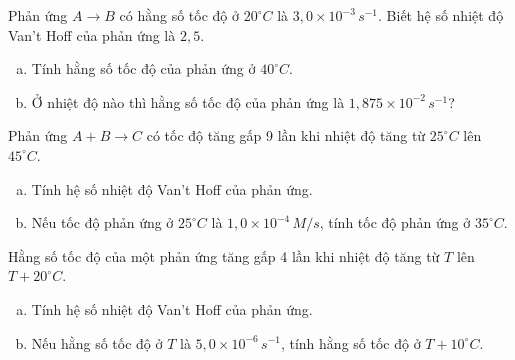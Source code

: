 \documentclass[Main.tex]{subfiles}
\begin{document}
\begin{bt}
	Phản ứng $A \rightarrow B$ có hằng số tốc độ ở $20^\circ C$ là $3{,}0 \times 10^{-3} \, s^{-1}$. Biết hệ số nhiệt độ Van't Hoff của phản ứng là $2{,}5$.
	\begin{enumerate}[a)]
		\item Tính hằng số tốc độ của phản ứng ở $40^\circ C$.
		\item Ở nhiệt độ nào thì hằng số tốc độ của phản ứng là $1{,}875 \times 10^{-2} \, s^{-1}$?
	\end{enumerate}
\end{bt}

\begin{bt}
	Phản ứng $A + B \rightarrow C$ có tốc độ tăng gấp 9 lần khi nhiệt độ tăng từ $25^\circ C$ lên $45^\circ C$.
	\begin{enumerate}[a)]
		\item Tính hệ số nhiệt độ Van't Hoff của phản ứng.
		\item Nếu tốc độ phản ứng ở $25^\circ C$ là $1{,}0 \times 10^{-4} \, M/s$, tính tốc độ phản ứng ở $35^\circ C$.
	\end{enumerate}
\end{bt}

\begin{bt}
	Hằng số tốc độ của một phản ứng tăng gấp 4 lần khi nhiệt độ tăng từ $T$ lên $T + 20^\circ C$.
	\begin{enumerate}[a)]
		\item Tính hệ số nhiệt độ Van't Hoff của phản ứng.
		\item Nếu hằng số tốc độ ở $T$ là $5{,}0 \times 10^{-6} \, s^{-1}$, tính hằng số tốc độ ở $T + 10^\circ C$.
	\end{enumerate}
\end{bt}
\end{document}
